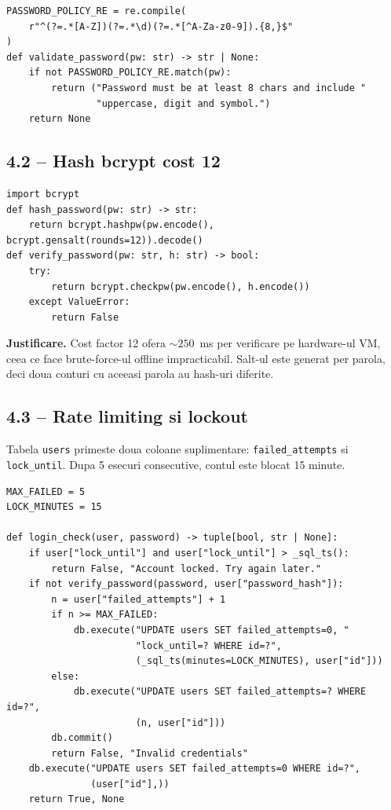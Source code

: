 \documentclass[12pt,a4paper]{article}
\begin{document}
\begin{lstlisting}[style=py, caption={Validare parola in v2}]
PASSWORD_POLICY_RE = re.compile(
    r"^(?=.*[A-Z])(?=.*\d)(?=.*[^A-Za-z0-9]).{8,}$"
)
def validate_password(pw: str) -> str | None:
    if not PASSWORD_POLICY_RE.match(pw):
        return ("Password must be at least 8 chars and include "
                "uppercase, digit and symbol.")
    return None
\end{lstlisting}

\subsection{4.2 -- Hash bcrypt cost 12}
\begin{lstlisting}[style=py, caption={Hash si verificare bcrypt}]
import bcrypt
def hash_password(pw: str) -> str:
    return bcrypt.hashpw(pw.encode(), bcrypt.gensalt(rounds=12)).decode()
def verify_password(pw: str, h: str) -> bool:
    try:
        return bcrypt.checkpw(pw.encode(), h.encode())
    except ValueError:
        return False
\end{lstlisting}
\textbf{Justificare.} Cost factor 12 ofera $\sim 250$~ms per verificare
pe hardware-ul VM, ceea ce face brute-force-ul offline impracticabil.
Salt-ul este generat per parola, deci doua conturi cu aceeasi parola au
hash-uri diferite.

\subsection{4.3 -- Rate limiting si lockout}
Tabela \texttt{users} primeste doua coloane suplimentare:
\texttt{failed\_attempts} si \texttt{lock\_until}. Dupa 5 esecuri
consecutive, contul este blocat 15 minute.

\begin{lstlisting}[style=py, caption={Lockout per cont in v2}]
MAX_FAILED = 5
LOCK_MINUTES = 15

def login_check(user, password) -> tuple[bool, str | None]:
    if user["lock_until"] and user["lock_until"] > _sql_ts():
        return False, "Account locked. Try again later."
    if not verify_password(password, user["password_hash"]):
        n = user["failed_attempts"] + 1
        if n >= MAX_FAILED:
            db.execute("UPDATE users SET failed_attempts=0, "
                       "lock_until=? WHERE id=?",
                       (_sql_ts(minutes=LOCK_MINUTES), user["id"]))
        else:
            db.execute("UPDATE users SET failed_attempts=? WHERE id=?",
                       (n, user["id"]))
        db.commit()
        return False, "Invalid credentials"
    db.execute("UPDATE users SET failed_attempts=0 WHERE id=?",
               (user["id"],))
    return True, None
\end{lstlisting}
\end{document}
